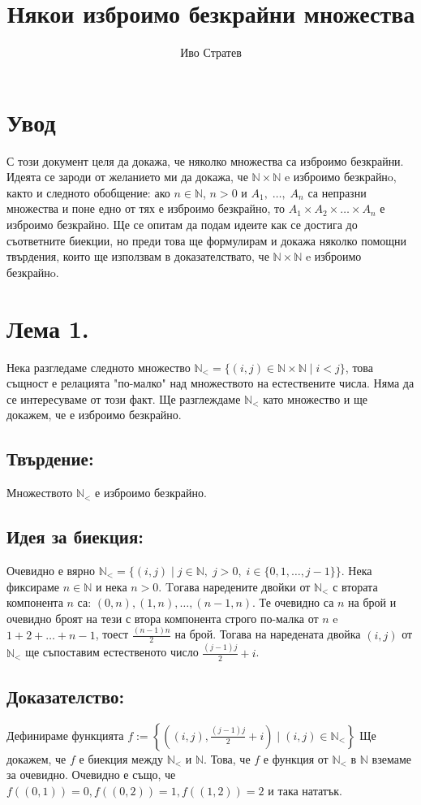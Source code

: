 \documentclass[a4paper, 12pt, oneside]{article}
\title{Някои изброимо безкрайни множества}
\author{Иво Стратев}
\newcommand{\N}{\mathbb{N}}
\newcommand{\LN}{\N_<}
\begin{document}
\maketitle
\section*{Увод}
С този документ целя да докажа, че няколко множества са изброимо безкрайни.
Идеята се зароди от желанието ми да докажа, че \(\N\times\N\) e изброимо безкрайнo,
както и следното обобщение: ако \(n \in \N\), \(n > 0\) и \(A_1, \; \dots, \; A_n\)
са непразни множества и поне едно от тях е изброимо безкрайно,
то \(A_1 \times A_2 \times \dots \times A_n\) е изброимо безкрайно.
Ще се опитам да подам идеите как се достига до съответните биекции,
но преди това ще формулирам и докажа няколко помощни твърдения,
които ще използвам в доказателствато, че \(\N\times\N\) e изброимо безкрайнo.
\section*{Лема 1.}
Нека разгледаме следното множество \(\LN = \{(i, j) \in \N\times\N \; | \; i < j\}\),
това същност е релацията "по-малко" над множеството на естествените числа.
Няма да се интересуваме от този факт. Ще разглеждаме \(\LN\) като множество и ще докажем,
че е изброимо безкрайно.
\subsection*{Твърдение:}
Множеството \(\LN\) е изброимо безкрайно.
\subsection*{Идея за биекция:}
Очевидно е вярно \(\LN = \{(i, j) \; | \; j \in \N, \; j > 0, \; i \in \{0, 1, \dots, j - 1\}\}\).
Нека фиксираме \(n \in \N\) и нека \(n > 0\). Tогава наредените двойки от \(\LN\)
с втората компонента \(n\) са: \((0, n), (1, n), \dots, (n - 1, n)\).
Те очевидно са \(n\) на брой и очевидно броят на тези с втора компонента строго по-малка от \(n\)
e \(1 + 2 + \dots + n - 1\), тоест \(\displaystyle\frac{(n - 1)n}{2}\) на брой.
Тогава на наредената двойка \((i, j)\) от \(\LN\) ще съпоставим естественото число \(\displaystyle\frac{(j - 1)j}{2} + i\). 
\subsection*{Доказателство:}
Дефинираме функцията \(f := \left\{\left((i, j), \displaystyle\frac{(j - 1)j}{2} + i\right) \; \Big| \; (i, j) \in \LN \right\}\)
Ще докажем, че \(f\) е биекция между \(\LN\) и \(\N\). Това, че \(f\) е функция от \(\LN\) в \(\N\) вземаме за очевидно.
Очевидно е също, че \(f((0, 1)) = 0, f((0, 2)) = 1, f((1, 2)) = 2\) и така нататък.
\end{document}
